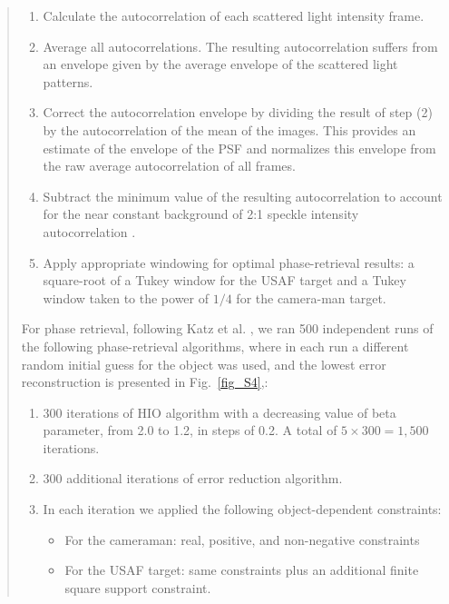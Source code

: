 \documentclass[12pt]{article}
\newenvironment{finished_ourresponse}
    {\begin{tcolorbox}[width=\linewidth,breakable,enhanced,colback=gray!5,colframe=finished_responsecolor!50,title=Response,left=5pt,right=5pt]}
    {\end{tcolorbox}}
\begin{document}
\begin{finished_ourresponse}
\begin{quote}
        \begin{enumerate}
            \item Calculate the autocorrelation of each scattered light intensity frame.
            \item Average all autocorrelations. The resulting autocorrelation suffers from an envelope given by the average envelope of the scattered light patterns.
            \item Correct the autocorrelation envelope by dividing the result of step (2) by the autocorrelation of the mean of the images. This provides an estimate of the envelope of the PSF and normalizes this envelope from the raw average autocorrelation of all frames.
            \item Subtract the minimum value of the resulting autocorrelation to account for the near constant background of 2:1 speckle intensity autocorrelation \cite{katz14}.
            \item Apply appropriate windowing for optimal phase-retrieval results: a square-root of a Tukey window for the USAF target and a Tukey window taken to the power of $1/4$  for the camera-man target.
        \end{enumerate}
        
        For phase retrieval, following Katz et al. \cite{katz14}, we ran 500 independent runs of the following phase-retrieval algorithms, where in each run a different random initial guess for the object was used, and the lowest error reconstruction is presented in Fig.~\ref {fig_S4},:
        \begin{enumerate}
            \item 300 iterations of HIO algorithm with a decreasing value of beta parameter, from 2.0 to 1.2, in steps of 0.2. A total of $5\times300=1,500$ iterations.
            \item 300 additional iterations of error reduction algorithm.
            \item In each iteration we applied the following object-dependent constraints:
            \begin{itemize}
                \item For the cameraman: real, positive, and non-negative constraints
                \item For the USAF target: same constraints plus an additional finite square support constraint.
            \end{itemize}

        \end{enumerate}
        


\end{quote}
\end{finished_ourresponse}
\end{document}
